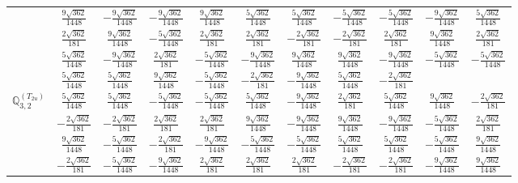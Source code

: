 \documentclass[fleqn,10pt,landscape]{article}
\begin{document}
\begin{itemize}
{\begin{center}
\begin{longtable}{ccccccccccc}
& $ \frac{9 \sqrt{362}}{1448} $ & $ - \frac{9 \sqrt{362}}{1448} $ & $ - \frac{9 \sqrt{362}}{1448} $ & $ \frac{9 \sqrt{362}}{1448} $ & $ \frac{5 \sqrt{362}}{1448} $ & $ \frac{5 \sqrt{362}}{1448} $ & $ - \frac{5 \sqrt{362}}{1448} $ & $ - \frac{5 \sqrt{362}}{1448} $ & $ - \frac{9 \sqrt{362}}{1448} $ & $ \frac{5 \sqrt{362}}{1448} $ \\
& $ \frac{2 \sqrt{362}}{181} $ & $ \frac{9 \sqrt{362}}{1448} $ & $ - \frac{5 \sqrt{362}}{1448} $ & $ \frac{2 \sqrt{362}}{181} $ & $ \frac{2 \sqrt{362}}{181} $ & $ - \frac{2 \sqrt{362}}{181} $ & $ - \frac{2 \sqrt{362}}{181} $ & $ \frac{2 \sqrt{362}}{181} $ & $ \frac{9 \sqrt{362}}{1448} $ & $ \frac{2 \sqrt{362}}{181} $ \\
& $ \frac{5 \sqrt{362}}{1448} $ & $ - \frac{9 \sqrt{362}}{1448} $ & $ \frac{2 \sqrt{362}}{181} $ & $ - \frac{5 \sqrt{362}}{1448} $ & $ - \frac{9 \sqrt{362}}{1448} $ & $ \frac{9 \sqrt{362}}{1448} $ & $ \frac{9 \sqrt{362}}{1448} $ & $ - \frac{9 \sqrt{362}}{1448} $ & $ - \frac{5 \sqrt{362}}{1448} $ & $ - \frac{5 \sqrt{362}}{1448} $ \\
& $ \frac{5 \sqrt{362}}{1448} $ & $ \frac{5 \sqrt{362}}{1448} $ & $ \frac{9 \sqrt{362}}{1448} $ & $ - \frac{5 \sqrt{362}}{1448} $ & $ - \frac{2 \sqrt{362}}{181} $ & $ - \frac{9 \sqrt{362}}{1448} $ & $ \frac{5 \sqrt{362}}{1448} $ & $ - \frac{2 \sqrt{362}}{181} $ & $  $ & $  $ \\ \hline
$\mathbb{Q}_{3,2}^{(T_{2u})}$ & $ \frac{5 \sqrt{362}}{1448} $ & $ \frac{5 \sqrt{362}}{1448} $ & $ - \frac{5 \sqrt{362}}{1448} $ & $ - \frac{5 \sqrt{362}}{1448} $ & $ \frac{5 \sqrt{362}}{1448} $ & $ - \frac{9 \sqrt{362}}{1448} $ & $ \frac{2 \sqrt{362}}{181} $ & $ \frac{5 \sqrt{362}}{1448} $ & $ \frac{9 \sqrt{362}}{1448} $ & $ - \frac{2 \sqrt{362}}{181} $ \\
& $ - \frac{2 \sqrt{362}}{181} $ & $ - \frac{2 \sqrt{362}}{181} $ & $ \frac{2 \sqrt{362}}{181} $ & $ \frac{2 \sqrt{362}}{181} $ & $ \frac{9 \sqrt{362}}{1448} $ & $ - \frac{9 \sqrt{362}}{1448} $ & $ \frac{9 \sqrt{362}}{1448} $ & $ - \frac{9 \sqrt{362}}{1448} $ & $ - \frac{5 \sqrt{362}}{1448} $ & $ \frac{2 \sqrt{362}}{181} $ \\
& $ \frac{9 \sqrt{362}}{1448} $ & $ - \frac{5 \sqrt{362}}{1448} $ & $ - \frac{2 \sqrt{362}}{181} $ & $ - \frac{9 \sqrt{362}}{1448} $ & $ - \frac{5 \sqrt{362}}{1448} $ & $ - \frac{5 \sqrt{362}}{1448} $ & $ \frac{5 \sqrt{362}}{1448} $ & $ \frac{5 \sqrt{362}}{1448} $ & $ - \frac{5 \sqrt{362}}{1448} $ & $ \frac{9 \sqrt{362}}{1448} $ \\
& $ - \frac{2 \sqrt{362}}{181} $ & $ - \frac{5 \sqrt{362}}{1448} $ & $ - \frac{9 \sqrt{362}}{1448} $ & $ \frac{2 \sqrt{362}}{181} $ & $ \frac{2 \sqrt{362}}{181} $ & $ \frac{2 \sqrt{362}}{181} $ & $ - \frac{2 \sqrt{362}}{181} $ & $ - \frac{2 \sqrt{362}}{181} $ & $ - \frac{9 \sqrt{362}}{1448} $ & $ \frac{9 \sqrt{362}}{1448} $ \\

\end{longtable}
\end{center}}
\end{itemize}
\end{document}
